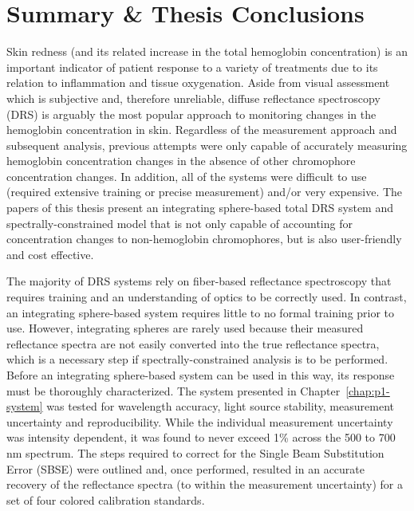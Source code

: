 \section{Summary \& Thesis Conclusions}
Skin redness (and its related increase in the total hemoglobin concentration) is an important indicator of patient response to a variety of treatments due to its relation to inflammation and tissue oxygenation. Aside from visual assessment which is subjective and, therefore unreliable, diffuse reflectance spectroscopy (DRS) is arguably the most popular approach to monitoring changes in the hemoglobin concentration in skin. Regardless of the measurement approach and subsequent analysis, previous attempts were only capable of accurately measuring hemoglobin concentration changes in the absence of other chromophore concentration changes. In addition, all of the systems were difficult to use (required extensive training or precise measurement) and/or very expensive. The papers of this thesis present an integrating sphere-based total DRS system and spectrally-constrained model that is not only capable of accounting for concentration changes to non-hemoglobin chromophores, but is also user-friendly and cost effective.

The majority of DRS systems rely on fiber-based reflectance spectroscopy that requires training and an understanding of optics to be correctly used. In contrast, an integrating sphere-based system requires little to no formal training prior to use. However, integrating spheres are rarely used because their measured reflectance spectra are not easily converted into the true reflectance spectra, which is a necessary step if spectrally-constrained analysis is to be performed. Before an integrating sphere-based system can be used in this way, its response must be thoroughly characterized. The system presented in Chapter~\ref{chap:p1-system} was tested for wavelength accuracy, light source stability, measurement uncertainty and reproducibility. While the individual measurement uncertainty was intensity dependent, it was found to never exceed 1\% across the 500 to 700 nm spectrum. The steps required to correct for the Single Beam Substitution Error (SBSE) were outlined and, once performed, resulted in an accurate recovery of the reflectance spectra (to within the measurement uncertainty) for a set of four colored calibration standards.

